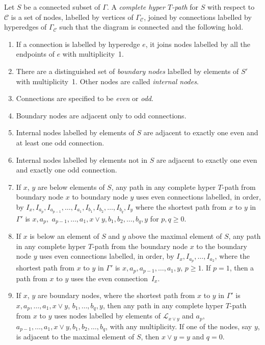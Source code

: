 \documentclass[pdftex]{sigma}
\numberwithin{equation}{section}
\begin{document}
\begin{Definition}\label{def:hyperTpath}
Let $S$ be a connected subset of $\Gamma$. A \emph{complete hyper $T$-path} for $S$ with respect to $\mathcal{C}$ is a set of nodes, labelled by vertices of $\Gamma_{\mathcal{C}}$, joined by connections labelled by hyperedges of $\Gamma_{\mathcal{C}}$ such that the diagram is connected and the following hold.
\begin{enumerate}\itemsep=0pt
 \item If a connection is labelled by hyperedge $e$, it joins nodes labelled by all the endpoints of $e$ with multiplicity~1.
 \item There are a distinguished set of \emph{boundary nodes} labelled by elements of $S'$ with multiplicity~1. Other nodes are called \emph{internal nodes}.
 \item Connections are specified to be \emph{even} or \emph{odd}.
 \item Boundary nodes are adjacent only to odd connections.
 \item Internal nodes labelled by elements of $S$ are adjacent to exactly one even and at least one odd connection.
 \item Internal nodes labelled by elements not in $S$ are adjacent to exactly one even and exactly one odd connection.
 \item If $x$, $y$ are below elements of $S$, any path in any complete hyper $T$-path from boundary node $x$ to boundary node $y$ uses even connections labelled, in order, by $I_x,I_{a_p},I_{a_{p-1}},\dots,I_{a_1},I_{b_1},\allowbreak I_{b_2},\dots,I_{b_q},I_y$ where the shortest path from $x$ to $y$ in $\Gamma'$ is $x,a_p,$ $a_{p-1},\dots,a_1,x\vee y,b_1,b_2,\dots,\allowbreak b_q,y$ for $p,q \geq 0$.
 \item If $x$ is below an element of $S$ and $y$ above the maximal element of $S$, any path in any complete hyper $T$-path from the boundary node $x$ to the boundary node $y$ uses even connections labelled, in order, by $I_x,I_{a_p},\ldots,I_{a_2}$, where the shortest path from $x$ to $y$ in $\Gamma'$ is $x,a_p,a_{p-1},\ldots,a_1,y$, $p \geq 1$. If $p = 1$, then a path from $x$ to $y$ uses the even connec\-tion~$I_x$.
 \item If $x$, $y$ are boundary nodes, where the shortest path from $x$ to $y$ in $\Gamma'$ is $x,a_p,\ldots,a_1,x\vee y$, $b_1, \ldots,b_q,y$, then any path in any complete hyper $T$-path from $x$ to $y$ uses nodes labelled by elements of $\mathcal{L}_{x\vee y}$ and $a_p,$ $a_{p-1},\dots,a_1,x\vee y,b_1,b_2,\dots,b_q$, with any multiplicity. If one of the nodes, say $y$, is adjacent to the maximal element of $S$, then $x \vee y = y$ and $q = 0$.
\end{enumerate}
\end{Definition}
\end{document}
